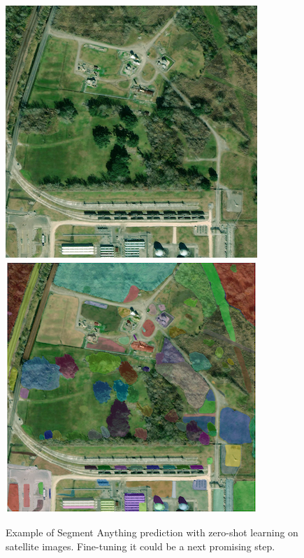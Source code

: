 \documentclass[10pt,twocolumn,letterpaper]{article}
\begin{document}
\begin{figure}[t]
  \begin{center}
  \includegraphics[width=0.48\linewidth]{final-report/figures/SAM_example.png}
   \includegraphics[width=0.48\linewidth]{final-report/figures/SAM_example_eval.png}
   \caption{Example of Segment Anything prediction with zero-shot learning on satellite images. Fine-tuning it could be a next promising step.}
   \label{fig:sam}
  \end{center}
   
\end{figure}




\end{document}
